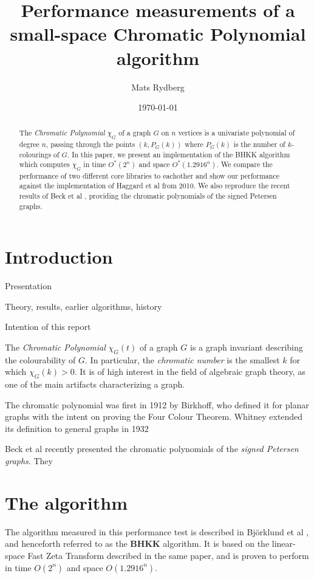 \documentclass[a4paper]{article}
\title{\huge{Performance measurements of a small-space Chromatic Polynomial algorithm}}
\author{Mats Rydberg}
\date{\today}
\begin{document}
\maketitle

\begin{abstract}
 The \emph{Chromatic Polynomial} $\chi_G$ of a graph $G$ on $n$ vertices is a univariate polynomial of degree $n$, passing through the points $(k, P_G(k))$ where $P_G(k)$ is the number of $k$-colourings of $G$. In this paper, we present an implementation of the BHKK algorithm which computes $\chi_G$ in time $O^*(2^n)$ and space $O^*(1.2916^n)$. We compare the performance of two different core libraries to eachother and show our performance against the implementation of Haggard et al \cite{haggard} from 2010. We also reproduce the recent results of Beck et al \cite{signed_petersen}, providing the chromatic polynomials of the signed Petersen graphs.
\end{abstract}

\newpage

\section{Introduction}

Presentation

Theory, results, earlier algorithms, history

Intention of this report


The \emph{Chromatic Polynomial} $\chi_G(t)$ of a graph $G$ is a graph invariant describing the colourability of $G$. In particular, the \emph{chromatic number} is the smallest $k$ for which $\chi_G(k) > 0$. It is of high interest in the field of algebraic graph theory, as one of the main artifacts characterizing a graph.

The chromatic polynomial was first in 1912 by Birkhoff, who defined it for planar graphs with the intent on proving the Four Colour Theorem. Whitney extended its definition to general graphs in 1932


Beck et al \cite{signed_petersen} recently presented the chromatic polynomials of the \emph{signed Petersen graphs}. They 

\section{The algorithm}
The algorithm measured in this performance test is described in Björklund et al \cite{cov_pack}, and henceforth referred to as the \textbf{BHKK} algorithm. It is based on the linear-space Fast Zeta Transform described in the same paper, and is proven to perform in time $O(2^n)$ and space $O(1.2916^n)$. 
\end{document}
